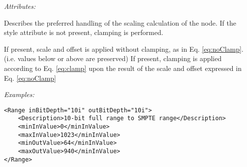 \emph{Attributes:}
\begin{xmlfields}
    \xmlitem[style][optional]
		Describes the preferred handling of the scaling calculation of the  node. If the style attribute is not present, clamping is performed.
		\begin{xmlfields}
			\xmlitemd["noClamp"] If present, scale and offset is applied without clamping, as in Eq. \ref{eq:noClamp}. \\
			(i.e. values below  or above  are preserved) 
			\xmlitemd["Clamp"] If present, clamping is applied according to Eq. \ref{eq:clamp} upon the result of the scale and offset expressed in  Eq. \ref{eq:noClamp}
		\end{xmlfields}
\end{xmlfields}

\emph{Examples:}
\begin{lstlisting}[caption=Using \xml{"Range"} for scaling 10-bit full range to 10-bit SMPTE (legal) range.]
<Range inBitDepth="10i" outBitDepth="10i">
	<Description>10-bit full range to SMPTE range</Description>
	<minInValue>0</minInValue>
	<maxInValue>1023</minInValue>
	<minOutValue>64</minInValue>
	<maxOutValue>940</minInValue>
</Range>
\end{lstlisting}